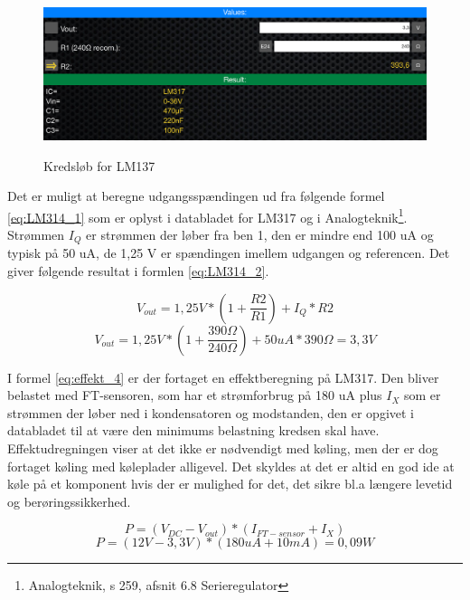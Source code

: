 \begin{figure}[H] \centering
{\includegraphics[width=\textwidth]{filer/design/Billeder/LM317_calc}}
\caption{Kredsløb for LM137}
\label{lab:LM317_calc}
\raggedright
\end{figure}

Det er muligt at beregne udgangsspændingen ud fra følgende formel \ref{eq:LM314_1} som er oplyst i databladet for LM317 og i Analogteknik\footnote{Analogteknik, s 259, afsnit 6.8 Serieregulator}. Strømmen $I_Q$ er strømmen der løber fra ben 1, den er mindre end 100 uA og typisk på 50 uA, de 1,25 V er spændingen imellem udgangen og referencen. Det giver følgende resultat i formlen \ref{eq:LM314_2}. 

\begin{equation} 
V_{out} = 1,25 V*(1+\frac{R2}{R1})+I_Q*R2
\label{eq:LM314_1}
\end{equation}
\begin{equation} 
V_{out} = 1,25 V*(1+\frac{390\Omega}{240\Omega})+50uA*390\Omega = 3,3 V
\label{eq:LM314_2}
\end{equation}


I formel \ref{eq:effekt_4} er der fortaget en effektberegning på LM317. Den bliver belastet med FT-sensoren, som har et strømforbrug på 180 uA plus $I_X$ som er strømmen der løber ned i kondensatoren og modstanden, den er opgivet i databladet til at være den minimums belastning kredsen skal have. Effektudregningen viser at det ikke er nødvendigt med køling, men der er dog  fortaget køling med køleplader alligevel. Det skyldes at det er altid en god ide at køle på et komponent hvis der er mulighed for det, det sikre bl.a længere levetid og berøringssikkerhed. 
 
\begin{equation} 
P = (V_{DC}-V_{out})*(I_{FT-sensor}+I_X) 
\label{eq:effekt_3}
\end{equation}
\begin{equation} 
P = (12V - 3,3V)*(180 uA +10 mA)= 0,09 W 
\label{eq:effekt_4}
\end{equation}


